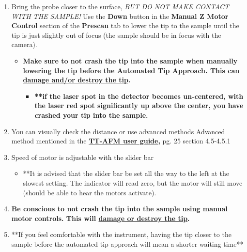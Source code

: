 \documentclass{../lab}
\begin{document}
\begin{enumerate}
    \item Bring the probe closer to the surface, \emph{BUT DO NOT MAKE CONTACT WITH THE SAMPLE!} Use the \textbf{Down} button in the \textbf{Manual Z Motor Control} section of the \textbf{Prescan} tab to lower the tip to the sample until the tip is just slightly out of focus (the sample should be in focus with the camera).
    \begin{itemize}
        \item \textbf{Make sure to not crash the tip into the sample when manually lowering the tip before the Automated Tip Approach. This can \hyperref[subsec:BrokenTip]{damage and/or destroy the tip}.}
        \begin{itemize}
            \item \textbf{**if the laser spot in the detector becomes un-centered, with the laser red spot significantly up above the center, you have crashed your tip into the sample.}
        \end{itemize}
    \end{itemize}
    
    \item You can visually check the distance or use advanced methods
    Advanced method mentioned in the \href{http://experimentationlab.berkeley.edu/sites/default/files/AFMImages/TT_AFM\%20User-Guide-V2.2-600DPI.pdf}{\textbf{TT-AFM user guide,}} pg. 25 section 4.5-4.5.1
    
    \item Speed of motor is adjustable with the slider bar
    \begin{itemize}
        \item **It is advised that the slider bar be set all the way to the left at the slowest setting.  The indicator will read zero, but the motor will still move (should be able to hear the motors activate).
    \end{itemize}
    
    \item\textbf{Be conscious to not crash the tip into the sample using manual motor controls. This will \hyperref[subsec:BrokenTip]{damage or destroy the tip}.}
    
    \item **If you feel comfortable with the instrument, having the tip closer to the sample before the automated tip approach will mean a shorter waiting time**
    

\end{enumerate}
\end{document}
